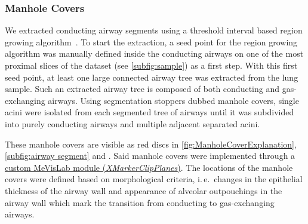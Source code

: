 \documentclass[a4paper,DIVcalc,abstract,english]{scrartcl}
\newcommand{\ie}{i.\,e.\ }
\begin{document}
\subsubsection{Manhole Covers}
We extracted conducting airway segments using a threshold interval based region growing algorithm~\cite{Zucker1976}.
To start the extraction, a seed point for the region growing algorithm was manually defined inside the conducting airways on one of the most proximal slices of the dataset (see \autoref{subfig:sample}) as a first step.
With this first seed point, at least one large connected airway tree was extracted from the lung sample.
Such an extracted airway tree is composed of both conducting and gas-exchanging airways.
Using segmentation stoppers dubbed manhole covers, single acini were isolated from each segmented tree of airways until it was subdivided into purely conducting airways and multiple adjacent separated acini. 

These manhole covers are visible as red discs in \autoref{fig:ManholeCoverExplanation}, \autoref{subfig:airway segment} and .
Said manhole covers were implemented through a \href{http://www.mevis-research.de/cgi-bin/discus/board-auth.cgi?lm=1282233250&file=/839/11760.html}{custom MeVisLab module (\emph{XMarkerClipPlanes})}.
The locations of the manhole covers were defined based on morphological criteria, \ie changes in the epithelial thickness of the airway wall and appearance of alveolar outpouchings in the airway wall which mark the transition from conducting to gas-exchanging airways.
\end{document}
